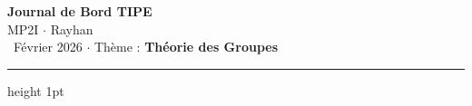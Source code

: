 \documentclass[a4paper,11pt]{article}
\begin{document}
\begin{flushleft}
    {\Huge \sffamily\bfseries Journal de Bord \textcolor{royal}{TIPE}}\\[0.2cm]
    {\Large \textsc{MP2I} $\cdot$ Rayhan}\\[0.1cm]
    {\color{gray} \faCalendar\ Février 2026 $\cdot$ Thème : \textbf{Théorie des Groupes}}
\end{flushleft}
\vspace{0.2cm}
\hrule height 1pt \vspace{1cm}







\end{document}
